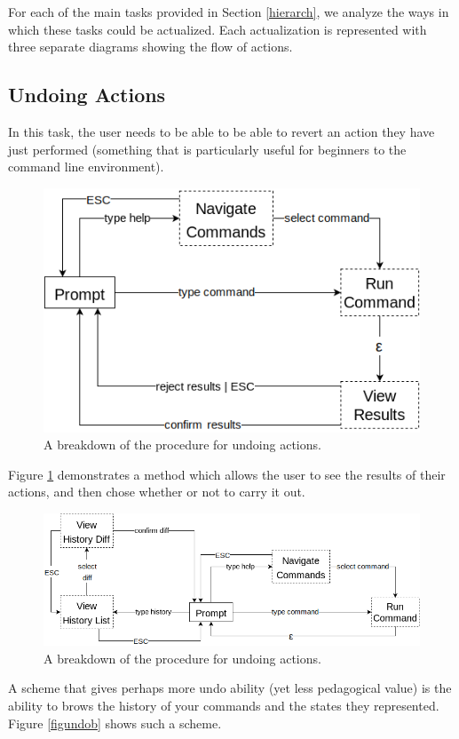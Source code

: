 For each of the main tasks provided in Section \ref{hierarch}, we analyze the
ways in which these tasks could be actualized. Each actualization is represented
with three separate diagrams showing the flow of actions.

\subsection{Undoing Actions}

In this task, the user needs to be able to be able to revert an action they have
just performed (something that is particularly useful for beginners to the
command line environment).
\begin{figure}[H]
  \centering
  \includegraphics[width=0.8\linewidth]{figures/alternatives/undo_a.png}
  \caption{A breakdown of the procedure for undoing actions.}
  \label{fig:undoa}
\end{figure}

Figure \ref{fig:undoa} demonstrates a method which allows the user to see the
results of their actions, and then chose whether or not to carry it out.

\begin{figure}[H]
  \centering
  \includegraphics[width=0.8\linewidth]{figures/alternatives/undo_b.png}
  \caption{A breakdown of the procedure for undoing actions.}
  \label{fig:undob}
\end{figure}

A scheme that gives perhaps more undo ability (yet less pedagogical value) is
the ability to brows the history of your commands and the states they
represented. Figure \ref{figundob} shows such a scheme.

